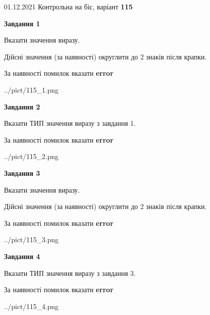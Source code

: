 \documentclass[11pt, ukrainian]{article}
\begin{document}
{01.12.2021 Контрольна на біс, варіант  \No \textbf { 115 }\par}
{
\begin {large}
{\begin {center}\textbf{Завдання 1}\end {center}}\par
Вказати значення виразу. \par
Дійсні значення (за наявності) округлити до 2 знаків після крапки. \par
За наявності помилок вказати \textbf{error}

\begin{center}
	{../pict/115_1.png}
\end{center}
\newpage

{\begin {center}\textbf{Завдання 2}\end {center}}\par
Вказати ТИП значення виразу з завдання 1. \par
За наявності помилок вказати \textbf{error}

\begin{center}
	{../pict/115_2.png}
\end{center}
\newpage

{\begin {center}\textbf{Завдання 3}\end {center}}\par
Вказати значення виразу. \par
Дійсні значення (за наявності) округлити до 2 знаків після крапки. \par
За наявності помилок вказати \textbf{error}

\begin{center}
	{../pict/115_3.png}
\end{center}
\newpage

{\begin {center}\textbf{Завдання 4}\end {center}}\par
Вказати ТИП значення виразу з завдання 3. \par
За наявності помилок вказати \textbf{error}

\begin{center}
	{../pict/115_4.png}
\end{center}
\newpage


\end{large}}
\end{document}

